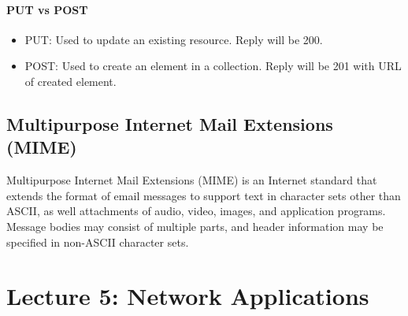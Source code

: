 \documentclass[a4paper]{article}
\begin{document}
\paragraph{PUT vs POST}
\begin{itemize}
    \item PUT: Used to update an existing resource. Reply will be 200. 
    \item POST: Used to create an element in a collection. Reply will be 201 with URL of created element.
\end{itemize}

\subsection{Multipurpose Internet Mail Extensions (MIME)}
Multipurpose Internet Mail Extensions (MIME) is an Internet standard that extends the format of email messages to support text in character sets other than ASCII, as well attachments of audio, video, images, and application programs. Message bodies may consist of multiple parts, and header information may be specified in non-ASCII character sets.

\section{Lecture 5: Network Applications}
\end{document}
